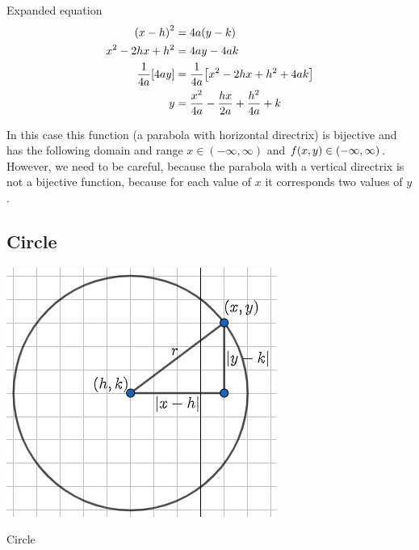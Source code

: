 \documentclass[../main-notes.tex]{subfile}
\begin{document}
\begin{note}{Expanded equation}{~}
 \begin{align*}
    \qty(x-h)^2 &= 4a\qty(y-k) \\
    x^2 -2hx +h^2 &= 4ay-4ak \\
    \frac{1}{4a}\qty[4ay] &=\frac{1}{4a}\qty[x^2 -2hx + h^2 +4ak] \\
    y &=\frac{x^2}{4a} -\frac{hx}{2a} +\frac{h^2}{4a}  +k 
\end{align*}

In this case this function (a parabola with horizontal directrix) is bijective and has the following domain and range $x\in(-\infty,\infty)$ and $f(x,y)\in\qty(-\infty,\infty)$.
However, we need to be careful, because the parabola with a vertical directrix is not a bijective function, because for each value of $x$ it corresponds two values of $y$.
\end{note}

\subsection{Circle}

\begin{marginfigure}
    \centering
    \includegraphics[width=\textwidth]{../Figures/circunference/circle-translate.jpg}
    \caption{Circle}\label{fig-circle-recap}
\end{marginfigure}
\end{document}
